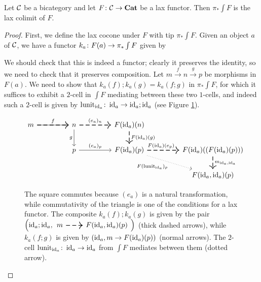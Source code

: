 \documentclass{article}
\begin{document}
\begin{proposition}
  Let ${\mathcal{C}}$ be a bicategory and let $F\colon {\mathcal{C}} \to {\normalfont\textbf{Cat}}$ be a lax functor.  
  Then $\pi_*\int F$ is the lax colimit of $F$.
  \label{PropGrotLaxLimit}
\end{proposition}
\begin{proof}
  First, we define the lax cocone under $F$ with tip $\pi_*\int F$.
  Given an object $a$ of ${\mathcal{C}}$, we have a functor $k_a \colon F(a) \to \pi_*\int F$ given by
  We should check that this is indeed a functor; clearly it preserves the identity, so we need to check that it preserves composition.  
  Let $m\xrightarrow{f}n\xrightarrow{g}p$ be morphisms in $F(a)$.  
  We need to show that $k_a(f);k_a(g) = k_a(f;g)$ in $\pi_*\int F$, for which it suffices to exhibit a $2$-cell in $\int F$ mediating between these two $1$-cells, and indeed such a $2$-cell is given by $\operatorname{lunit}_{\operatorname{id}_a}\colon \operatorname{id}_a \to \operatorname{id}_a;\operatorname{id}_a$ (see Figure \ref{FigKaFG=KaFKaG}).
  \begin{figure}
    \[
      \begin{tikzcd}[column sep=45pt]
        m \arrow[r, thick, dashed, "f"] \arrow[r]
          & n \arrow[r, thick, dashed, "(e_a)_n"] \arrow[d, "g"']
            & F(\id_a)(n) \arrow[d, thick, dashed, "F(\id_a)(g)"]
              & \\
          & p \arrow[r, "(e_a)_p"]
            & F(\id_a)(p) \arrow[r, thick, dashed, "F(\id_a)(e_p)" xshift=-3pt] \arrow[dr, dotted, "F(\lunit_{\id_a})_p"']
              & F(\id_a)((F(\id_a)(p))) \arrow[d, thick, dashed, "{m_{\id_a,\id_a}}"] \\
          &
            &
              & F(\id_a,\id_a)(p)
      \end{tikzcd}
      \]
    \caption[The composite $k_a(f);k_a(g)$ is equal to $k_a(f;g)$ in $\pi_*\int F$.]{The square commutes because $(e_a)$ is a natural transformation, while commutativity of the triangle is one of the conditions for a lax functor.  
The composite $k_a(f);k_a(g)$ is given by the pair $\left(\id_a;\id_a, {\begin{tikzcd}[ampersand replacement=\&]m \arrow[r, thick, dashed] \& F(\id_a,\id_a)(p)\end{tikzcd}}\right)$ (thick dashed arrows), while $k_a(f;g)$ is given by $\left(\operatorname{id}_a,m \to F(\operatorname{id}_a)(p)\right)$ (normal arrows). The $2$-cell $\operatorname{lunit}_{\operatorname{id}_a}\colon \operatorname{id}_a\to\operatorname{id}_a$ from $\int F$ mediates between them (dotted arrow).}
      \label{FigKaFG=KaFKaG}
  \end{figure}


\end{proof}
\end{document}
